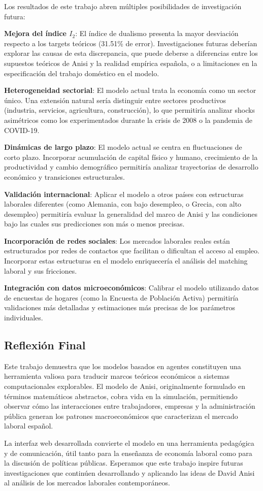 Los resultados de este trabajo abren múltiples posibilidades de investigación futura:

\textbf{Mejora del índice $I_2$}: El índice de dualismo presenta la mayor desviación respecto a los targets teóricos (31.51\% de error). Investigaciones futuras deberían explorar las causas de esta discrepancia, que puede deberse a diferencias entre los supuestos teóricos de Anisi y la realidad empírica española, o a limitaciones en la especificación del trabajo doméstico en el modelo.

\textbf{Heterogeneidad sectorial}: El modelo actual trata la economía como un sector único. Una extensión natural sería distinguir entre sectores productivos (industria, servicios, agricultura, construcción), lo que permitiría analizar shocks asimétricos como los experimentados durante la crisis de 2008 o la pandemia de COVID-19.

\textbf{Dinámicas de largo plazo}: El modelo actual se centra en fluctuaciones de corto plazo. Incorporar acumulación de capital físico y humano, crecimiento de la productividad y cambio demográfico permitiría analizar trayectorias de desarrollo económico y transiciones estructurales.

\textbf{Validación internacional}: Aplicar el modelo a otros países con estructuras laborales diferentes (como Alemania, con bajo desempleo, o Grecia, con alto desempleo) permitiría evaluar la generalidad del marco de Anisi y las condiciones bajo las cuales sus predicciones son más o menos precisas.

\textbf{Incorporación de redes sociales}: Los mercados laborales reales están estructurados por redes de contactos que facilitan o dificultan el acceso al empleo. Incorporar estas estructuras en el modelo enriquecería el análisis del matching laboral y sus fricciones.

\textbf{Integración con datos microeconómicos}: Calibrar el modelo utilizando datos de encuestas de hogares (como la Encuesta de Población Activa) permitiría validaciones más detalladas y estimaciones más precisas de los parámetros individuales.

\subsection{Reflexión Final}

Este trabajo demuestra que los modelos basados en agentes constituyen una herramienta valiosa para traducir marcos teóricos económicos a sistemas computacionales explorables. El modelo de Anisi, originalmente formulado en términos matemáticos abstractos, cobra vida en la simulación, permitiendo observar cómo las interacciones entre trabajadores, empresas y la administración pública generan los patrones macroeconómicos que caracterizan el mercado laboral español.

La interfaz web desarrollada convierte el modelo en una herramienta pedagógica y de comunicación, útil tanto para la enseñanza de economía laboral como para la discusión de políticas públicas. Esperamos que este trabajo inspire futuras investigaciones que continúen desarrollando y aplicando las ideas de David Anisi al análisis de los mercados laborales contemporáneos.

